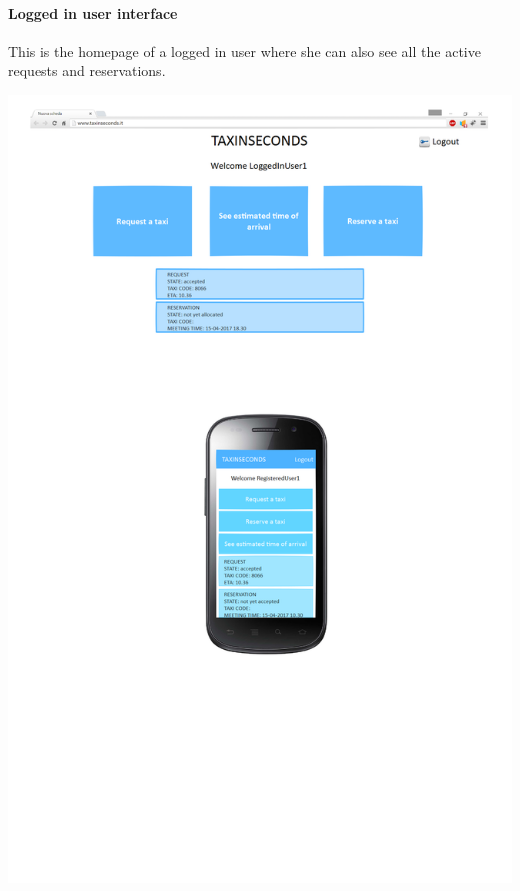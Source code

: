 \documentclass{article}
\begin{document}
\paragraph{Logged in user interface}
This is the homepage of a logged in user where she can also see all the active requests and reservations.\\
\begin{center}
	\includegraphics[width=.9\textwidth,height=.9\textheight,keepaspectratio]{LoggedinUserInterface}
\end{center}
\clearpage
\end{document}
